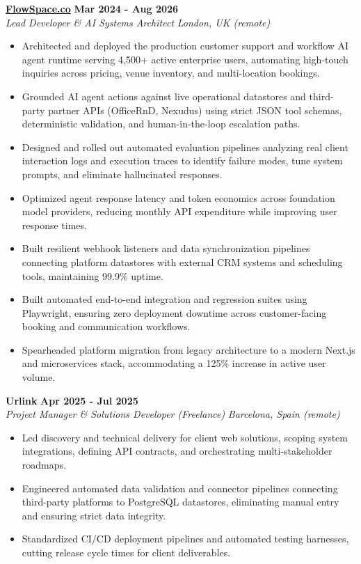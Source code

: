 \documentclass[10pt,a4paper]{article}
\newcommand{\role}[4]{%
  \textbf{#1} \hfill \textbf{#2}\\[1pt]%
  \textit{#3} \hfill \textit{#4}\\[2pt]%
}
\begin{document}
\role{\href{https://flowspace.co}{FlowSpace.co}}{Mar 2024 - Aug 2026}{Lead Developer \& AI Systems Architect}{London, UK (remote)}
\begin{itemize}
  \item Architected and deployed the production customer support and workflow AI agent runtime serving 4,500+ active enterprise users, automating high-touch inquiries across pricing, venue inventory, and multi-location bookings.
  \item Grounded AI agent actions against live operational datastores and third-party partner APIs (OfficeRnD, Nexudus) using strict JSON tool schemas, deterministic validation, and human-in-the-loop escalation paths.
  \item Designed and rolled out automated evaluation pipelines analyzing real client interaction logs and execution traces to identify failure modes, tune system prompts, and eliminate hallucinated responses.
  \item Optimized agent response latency and token economics across foundation model providers, reducing monthly API expenditure while improving user response times.
  \item Built resilient webhook listeners and data synchronization pipelines connecting platform datastores with external CRM systems and scheduling tools, maintaining 99.9\% uptime.
  \item Built automated end-to-end integration and regression suites using Playwright, ensuring zero deployment downtime across customer-facing booking and communication workflows.
  \item Spearheaded platform migration from legacy architecture to a modern Next.js and microservices stack, accommodating a 125\% increase in active user volume.
\end{itemize}

\role{Urlink}{Apr 2025 - Jul 2025}{Project Manager \& Solutions Developer (Freelance)}{Barcelona, Spain (remote)}
\begin{itemize}
  \item Led discovery and technical delivery for client web solutions, scoping system integrations, defining API contracts, and orchestrating multi-stakeholder roadmaps.
  \item Engineered automated data validation and connector pipelines connecting third-party platforms to PostgreSQL datastores, eliminating manual entry and ensuring strict data integrity.
  \item Standardized CI/CD deployment pipelines and automated testing harnesses, cutting release cycle times for client deliverables.
\end{itemize}
\end{document}

